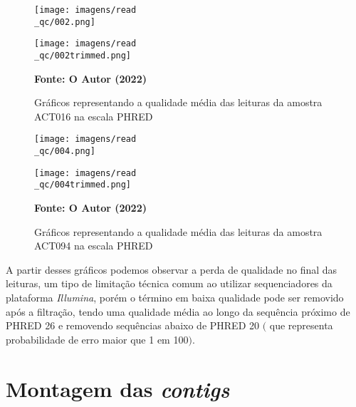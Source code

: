 \begin{figure}[H]
	\caption{Gráficos representando a qualidade média das leituras da amostra ACT016 na escala PHRED}
	\label{fig:fastqc_antes}
	\centering
	\begin{minipage}{.5\linewidth}
		\texttt{[image: imagens/read\\\_qc/002.png]}\\
	  \end{minipage}
	  \hspace{.01\linewidth}
	  \begin{minipage}{.5\linewidth}
		\texttt{[image: imagens/read\\\_qc/002trimmed.png]}\\
	  \end{minipage}
	\centering
    \begin{small}\textbf{Fonte: O Autor (2022)}\end{small}
\end{figure}
\vspace{\floatsep}
\begin{figure}[H]
	\caption{Gráficos representando a qualidade média das leituras da amostra ACT094 na escala PHRED}
	\label{fig:fastqc_antes}
	\centering
	\begin{minipage}{.45\linewidth}
		\texttt{[image: imagens/read\\\_qc/004.png]} \\
	  \end{minipage}
	  \hspace{.01\linewidth}
	  \begin{minipage}{.45\linewidth}
		\texttt{[image: imagens/read\\\_qc/004trimmed.png]} \\
	  \end{minipage}
	\centering
    \begin{small}\textbf{Fonte: O Autor (2022)}\end{small}
\end{figure}
\vspace{\floatsep}

A partir desses gráficos podemos observar a perda de qualidade no final das leituras, um tipo de limitação
técnica comum ao utilizar sequenciadores da plataforma \textit{Illumina}, porém o término em baixa qualidade
pode ser removido após a filtração, tendo uma qualidade média ao longo da sequência próximo de PHRED 26 e
removendo sequências abaixo de PHRED 20 $($ que representa probabilidade de erro maior que 1 em 100$)$.


\section{Montagem das \textit{contigs}}

